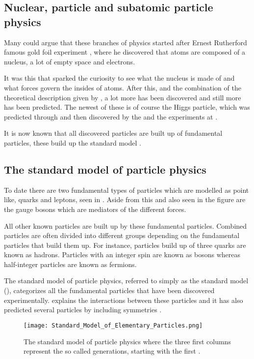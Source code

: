 \subsection{Nuclear, particle and subatomic particle physics}\label{sec:tb:subsec:nps}
Many could argue that these branches of physics started after Ernest Rutherford famous gold foil experiment \citep{Burchan:1995}, where he discovered that atoms are composed of a nucleus, a lot of empty space and electrons. 

It was this that sparked the curiosity to see what the nucleus is made of and what forces govern the insides of atoms. After this, and the combination of the theoretical description given by \abbrQM, a lot more has been discovered and still more has been predicted. The newest of these is of course the Higgs particle, which was predicted through \abbrQFT and then discovered by the \abbrATLAS and the \abbrCMS experiments at \abbrCERN \citep{Higgs:2012, Chatrchyan:2012}. 

It is now known that all discovered particles are built up of fundamental particles, these build up the standard model \citep{Burchan:1995}.
\subsection{The standard model of particle physics}\label{sec:tb:subsec:SM}
To date there are two fundamental types of particles which are modelled as point like, quarks and leptons, seen in . Aside from this and also seen in the figure are the gauge bosons which are mediators of the different forces.

All other known particles are built up by these fundamental particles. Combined particles are often divided into different groups depending on the fundamental particles that build them up. For instance, particles build up of three quarks are known as hadrons. Particles with an integer spin are known as bosons whereas half-integer particles are known as fermions.

The standard model of particle physics, referred to simply as the standard model (\abbrSM), categorizes all the fundamental particles that have been discovered experimentally. \abbrQFT explains the interactions between these particles and it has also predicted several particles by including symmetries \citep{Burchan:1995}.
\begin{figure}[h]
 \centering
\texttt{[image: Standard\_Model\_of\_Elementary\_Particles.png]}
  \caption{{\small The standard model of particle physics where the three first columns represent the so called generations, starting with the first \citep{wiki1}.}}
    \label{fig:SM}
\end{figure}

